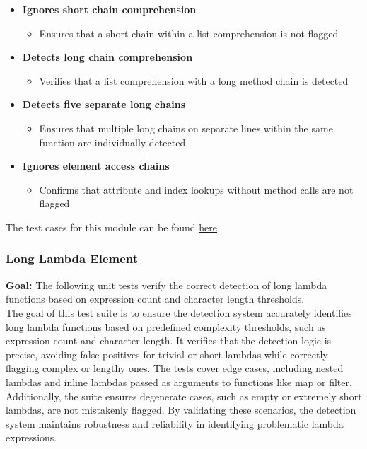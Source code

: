 \documentclass[12pt, titlepage]{article}
\begin{document}
\begin{itemize}
    \item \textbf{Ignores short chain comprehension}
        \begin{itemize}
        \item Ensures that a short chain within a list comprehension is not flagged
        \end{itemize}

    \item \textbf{Detects long chain comprehension}
        \begin{itemize}
        \item Verifies that a list comprehension with a long method chain is detected
        \end{itemize}

    \item \textbf{Detects five separate long chains}
        \begin{itemize}
        \item Ensures that multiple long chains on separate lines within the same function are individually detected
        \end{itemize}

    \item \textbf{Ignores element access chains}
        \begin{itemize}
        \item Confirms that attribute and index lookups without method calls are not flagged
        \end{itemize}
\end{itemize}

  \noindent The test cases for this module can be found
  \href{https://github.com/ssm-lab/capstone--source-code-optimizer/blob/main/tests/analyzers/test_long_message_chain.py}{here}

  \subsubsection{Long Lambda Element}

  \textbf{Goal:} The following unit tests verify the correct
  detection of long lambda functions based on expression count and
  character length thresholds.\\

  \noindent The goal of this test suite is to ensure the detection
  system accurately identifies long lambda
  functions based on predefined complexity thresholds, such as
  expression count and character
  length. It verifies that the detection logic is precise, avoiding
  false positives for trivial
  or short lambdas while correctly flagging complex or lengthy ones.
  The tests cover edge cases,
  including nested lambdas and inline lambdas passed as arguments to
  functions like map or
  filter. Additionally, the suite ensures degenerate cases, such as
  empty or extremely short
  lambdas, are not mistakenly flagged. By validating these scenarios,
  the detection system
  maintains robustness and reliability in identifying problematic
  lambda expressions.\\
\end{document}
